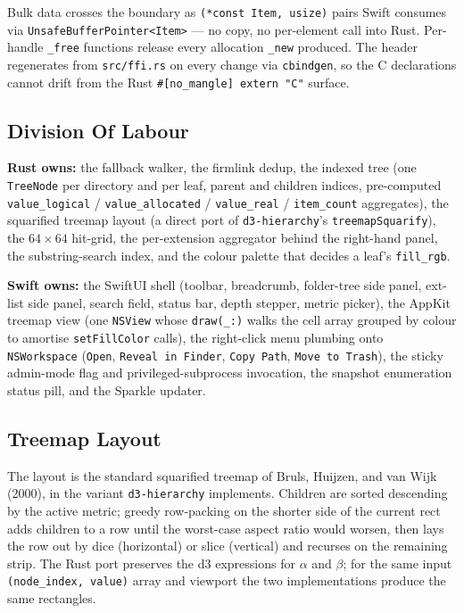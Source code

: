 Bulk data crosses the boundary as \texttt{(*const Item, usize)}
pairs Swift consumes via \texttt{UnsafeBufferPointer<Item>} ---
no copy, no per-element call into Rust. Per-handle
\texttt{\_free} functions release every allocation \texttt{\_new}
produced. The header regenerates from \texttt{src/ffi.rs} on every
change via \texttt{cbindgen}, so the C declarations cannot drift
from the Rust \texttt{\#[no\_mangle] extern "C"} surface.

\subsection{Division Of Labour}

\textbf{Rust owns:} the fallback walker, the firmlink dedup, the
indexed tree (one \texttt{TreeNode} per directory and per leaf,
parent and children indices, pre-computed
\texttt{value\_logical} / \texttt{value\_allocated} /
\texttt{value\_real} / \texttt{item\_count} aggregates), the
squarified treemap layout (a direct port of
\texttt{d3-hierarchy}'s \texttt{treemapSquarify}), the
$64 \times 64$ hit-grid, the per-extension aggregator behind the
right-hand panel, the substring-search index, and the colour
palette that decides a leaf's \texttt{fill\_rgb}.

\textbf{Swift owns:} the SwiftUI shell (toolbar, breadcrumb,
folder-tree side panel, ext-list side panel, search field,
status bar, depth stepper, metric picker), the AppKit treemap
view (one \texttt{NSView} whose \texttt{draw(\_:)} walks the cell
array grouped by colour to amortise \texttt{setFillColor}
calls), the right-click menu plumbing onto \texttt{NSWorkspace}
(\texttt{Open}, \texttt{Reveal in Finder}, \texttt{Copy Path},
\texttt{Move to Trash}), the sticky admin-mode flag and
privileged-subprocess invocation, the snapshot enumeration
status pill, and the Sparkle updater.

\subsection{Treemap Layout}

The layout is the standard squarified treemap of Bruls, Huijzen,
and van Wijk (2000), in the variant \texttt{d3-hierarchy}
implements. Children are sorted descending by the active metric;
greedy row-packing on the shorter side of the current rect adds
children to a row until the worst-case aspect ratio would worsen,
then lays the row out by dice (horizontal) or slice (vertical)
and recurses on the remaining strip. The Rust port preserves the
d3 expressions for $\alpha$ and $\beta$; for the same input
\texttt{(node\_index, value)} array and viewport the two
implementations produce the same rectangles.

